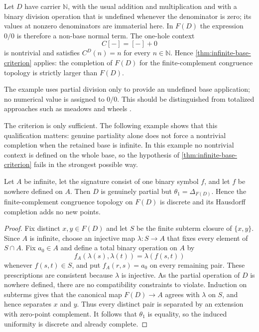 \begin{example}\label{ex:natural-numbers}
Let $D$ have carrier $\mathbb N$, with the usual addition and multiplication
and with a binary division operation that is undefined whenever the denominator
is zero; its values at nonzero denominators are immaterial here.  In $F(D)$ the
expression $0/0$ is therefore a non-base normal term.  The one-hole context
\[
 C[-]=[-]+0
\]
is nontrivial and satisfies $C^D(n)=n$ for every $n\in\mathbb N$.  Hence
\cref{thm:infinite-base-criterion} applies: the completion of $F(D)$ for the
finite-complement congruence topology is strictly larger than $F(D)$.
\end{example}

The example uses partial division only to provide an undefined base
application; no numerical value is assigned to $0/0$.  This should be
distinguished from totalized approaches such as meadows and wheels
\cite{BergstraHirshfeldTucker2009,Carlstrom2004}.

The criterion is only sufficient.  The following example shows that this
qualification matters: genuine partiality alone does not force a nontrivial
completion when the retained base is infinite.  In this example no nontrivial
context is defined on the whole base, so the hypothesis of
\cref{thm:infinite-base-criterion} fails in the strongest possible way.

\begin{proposition}
\label{prop:discrete-example}
Let $A$ be infinite, let the signature consist of one binary symbol $f$, and
let $f$ be nowhere defined on $A$.  Then $D$ is genuinely partial but
$\theta_1=\Delta_{F(D)}$.  Hence the finite-complement congruence topology on
$F(D)$ is discrete and its Hausdorff completion adds no new points.
\end{proposition}

\begin{proof}
Fix distinct $x,y\in F(D)$ and let $S$ be the finite subterm closure of
$\{x,y\}$.  Since $A$ is infinite, choose an injective map
$\lambda:S\to A$ that fixes every element of $S\cap A$.  Fix $a_0\in A$ and
define a total binary operation on $A$ by
\[
 f_A(\lambda(s),\lambda(t))=\lambda(f(s,t))
\]
whenever $f(s,t)\in S$, and put $f_A(r,s)=a_0$ on every remaining pair.
These prescriptions are consistent because $\lambda$ is injective.  As the
partial operation of $D$ is nowhere defined, there are no compatibility
constraints to violate.  Induction on subterms gives that the canonical map
$F(D)\to A$ agrees with $\lambda$ on $S$, and hence separates $x$ and $y$.
Thus every distinct pair is separated by an extension with zero-point
complement.  It follows that $\theta_1$ is equality, so the induced uniformity
is discrete and already complete.
\end{proof}

